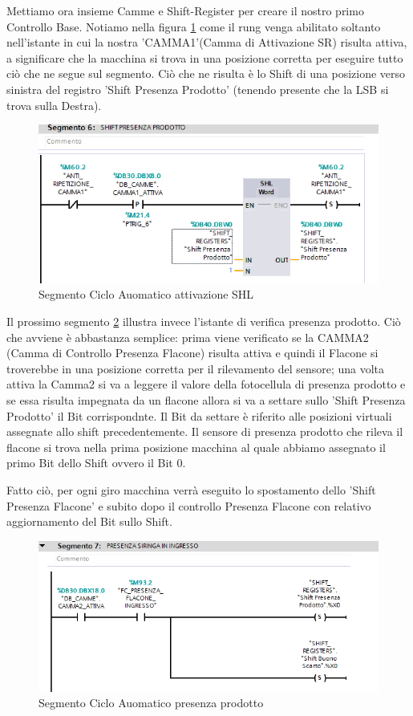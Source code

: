 \documentclass[12pt, a4paper, oneside]{book}
\begin{document}
Mettiamo ora insieme Camme e Shift-Register per creare il nostro primo Controllo Base. Notiamo nella figura \ref{sh3} come il rung venga abilitato soltanto nell'istante in cui la nostra 'CAMMA1'(Camma di Attivazione SR) risulta attiva, a significare che la macchina si trova in una posizione corretta per eseguire tutto ciò che ne segue sul segmento. Ciò che ne risulta è lo Shift di una posizione verso sinistra del registro 'Shift Presenza Prodotto' (tenendo presente che la LSB si trova sulla Destra).


\begin{figure}[H]
	\centering
	\includegraphics[width=12cm]{Immagini/SH3}
	\caption{ Segmento Ciclo Auomatico attivazione SHL}
	\label{sh3}
\end{figure}

Il prossimo segmento \ref{sh4} illustra invece l'istante di verifica presenza prodotto. Ciò che avviene è abbastanza semplice: prima viene verificato se la CAMMA2 (Camma di Controllo Presenza Flacone) risulta attiva e quindi il Flacone si troverebbe in una posizione corretta per il rilevamento del sensore; una volta attiva la Camma2 si va a leggere il valore della fotocellula di presenza prodotto e se essa risulta impegnata da un flacone allora si va a settare sullo 'Shift Presenza Prodotto' il Bit corrispondnte. Il Bit da settare è riferito alle posizioni virtuali assegnate allo shift precedentemente. Il sensore di presenza prodotto che rileva il flacone si trova nella prima posizione macchina al quale abbiamo assegnato il primo Bit dello Shift ovvero il Bit 0. 

Fatto ciò, per ogni giro macchina verrà eseguito lo spostamento dello 'Shift  Presenza Flacone' e subito dopo il controllo Presenza Flacone con relativo aggiornamento del Bit sullo Shift.

\begin{figure}[H]
	\centering
	\includegraphics[width=12cm]{Immagini/SH4}
	\caption{ Segmento Ciclo Auomatico presenza prodotto}
	\label{sh4}
\end{figure}
\end{document}
